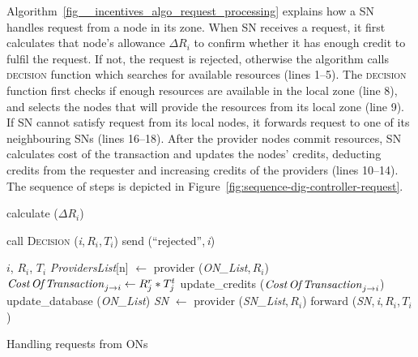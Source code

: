 Algorithm~\ref{fig__incentives_algo_request_processing} explains how a SN handles request from a node in its zone.
When SN receives a request, it first calculates that node's allowance $\Delta {R }_{ i }$ to confirm whether it has enough credit to fulfil the request. 
If not, the request is rejected, otherwise the algorithm calls \textsc{decision} function which searches for available resources (lines 1--5).
The \textsc{decision} function first checks if enough resources are available in the local zone (line 8), 
and selects the nodes that will provide the resources from its local zone (line 9).
If SN cannot satisfy request from its local nodes, it forwards request to one of its neighbouring SNs (lines 16--18).
After the provider nodes commit resources, SN calculates cost of the transaction and updates the 
nodes' credits, deducting credits from the requester and increasing credits of the providers (lines 10--14).
The sequence of steps is depicted in Figure~\ref{fig:sequence-dig-controller-request}.


\begin{algorithm}[tbp]
	\small
	\begin{algorithmic}[1]


		\State calculate ($\Delta { R }_{ i }$)
		
		\State call \textsc{Decision} (\emph{i},\,${ R }_{ i }$,\,${ T }_{ i }$)
		\Else
		\State send (``rejected'',\,\emph{i})
		\EndIf

		 {${i}$, ${ R }_{ i }$, ${ T }_{ i }$}
		\State \emph{ProvidersList}[n]  $\leftarrow$ provider (\emph{ON\_List},\,${ R }_{ i }$)
		\State ${\text{\emph{Cost\,Of\,Transaction}}}_{j \rightarrow i} \leftarrow {R}_{ j }^{ r} * {T }_{ j }^{t}$
		\State update\_credits (${\text{\emph{Cost\,Of\,Transaction}}}_{j \rightarrow i}$) 
		\State update\_database (\emph{ON\_List})
		\EndFor
		\Else
		\State \emph{SN} $\leftarrow$ provider (\emph{SN\_List},\,${ R }_{ i }$) 
		\State forward (\emph{SN},\,\emph{i},\,${ R }_{ i }$,\,${ T }_{ i }$)
		\EndIf
		\EndProcedure

	\end{algorithmic}
	\caption{Handling requests from ONs}
	\label{fig__incentives_algo_request_processing}
\end{algorithm}

